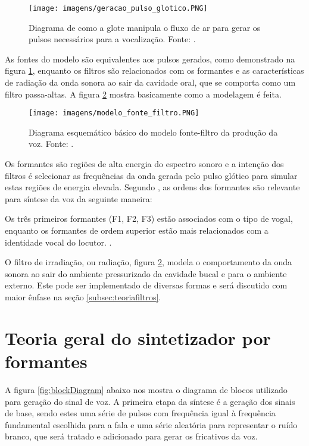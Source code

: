 \documentclass[
  12pt,       
  openright,      
  twoside,      
  a4paper,      
  english,      
  french,       
  spanish,      
  brazil,     
  ]{abntex2}
\begin{document}
\begin{figure}
\centering
\texttt{[image: imagens/geracao\_pulso\_glotico.PNG]}
\caption{Diagrama de como a glote manipula o fluxo de ar para gerar os pulsos necessários para a vocalização. Fonte: .}
\label{fig:geracaoPulsosGloticos}
\centering
\end{figure}

As fontes do modelo são equivalentes aos pulsos gerados, como demonstrado na figura \ref{fig:geracaoPulsosGloticos}, enquanto os filtros são relacionados com os formantes e as características de radiação da onda sonora ao sair da cavidade oral, que se comporta como um filtro passa-altas. A figura \ref{fig:modeloFonteFiltro} mostra basicamente como a modelagem é feita.

\begin{figure}
\texttt{[image: imagens/modelo\_fonte\_filtro.PNG]}
\caption{Diagrama esquemático básico do modelo fonte-filtro da produção da voz. Fonte: .}
\label{fig:modeloFonteFiltro}
\end{figure}

Os formantes são regiões de alta energia do espectro sonoro e a intenção dos filtros é selecionar as frequências da onda gerada pelo pulso glótico para simular estas regiões de energia elevada. Segundo , as ordens dos formantes são relevante para síntese da voz da seguinte maneira:

\begin{citacao}
Os três primeiros formantes (F1, F2, F3) estão associados com o tipo de vogal, enquanto os formantes de ordem superior estão mais relacionados com a identidade vocal do locutor. \cite{maurilio_1999}.
\end{citacao}

O filtro de irradiação, ou radiação, figura \ref{fig:modeloFonteFiltro}, modela o comportamento da onda sonora ao sair do ambiente pressurizado da cavidade bucal e para o ambiente externo. Este pode ser implementado de diversas formas e será discutido com maior ênfase na seção \ref{subsec:teoriafiltros}.

\section{Teoria geral do sintetizador por formantes}
\label{subsec:teoriaSintetizador}
A figura \ref{fig:blockDiagram} abaixo nos mostra o diagrama de blocos utilizado para  geração do sinal de voz. A primeira etapa da síntese é a geração dos sinais de base, sendo estes uma série de pulsos com frequência igual à frequência fundamental escolhida para a fala e uma série aleatória para representar o ruído branco, que será tratado e adicionado para gerar os fricativos da voz.
\end{document}

